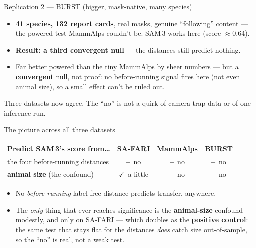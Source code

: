 \documentclass[aspectratio=169,11pt]{beamer}
\newcommand{\ck}{{\color{forest}$\checkmark$}}
\newcommand{\no}{{\color{burnt}\textbf{--}}}
\begin{document}
\begin{frame}{Replication 2 --- BURST (bigger, mask-native, many species)}
  \begin{itemize}\footnotesize
    \item \textbf{41 species, 132 report cards}, real masks, genuine ``following'' content --- the powered test
          MammAlps couldn't be. SAM\,3 works here (score $\approx 0.64$).
    \item \textbf{Result: a third convergent null} --- the distances still predict nothing.
    \item Far better powered than the tiny MammAlps by sheer numbers --- but a \textbf{convergent} null, not
          proof: no before-running signal fires here (not even animal size), so a small effect can't be ruled out.
  \end{itemize}
  \vspace{0.3em}
  \begin{block}{}\centering\footnotesize
    Three datasets now agree. The ``no'' is not a quirk of camera-trap data or of one inference run.
  \end{block}
\end{frame}

\begin{frame}{The picture across all three datasets}
  \centering
  \footnotesize
  \begin{tabular}{lccc}
    \toprule
    Predict SAM\,3's score from\dots & SA-FARI & MammAlps & BURST \\
    \midrule
    the four before-running distances & \no\ no & \no\ no & \no\ no \\
    \textbf{animal size} (the confound) & \ck\ a little & \no\ no & \no\ no \\
    \bottomrule
  \end{tabular}
  \vspace{0.6em}
  \begin{itemize}\footnotesize
    \item No \emph{before-running} label-free distance predicts transfer, anywhere.
    \item The \emph{only} thing that ever reaches significance is the \textbf{animal-size} confound --- modestly,
          and only on SA-FARI --- which doubles as the \textbf{positive control}: the same test that stays flat
          for the distances \emph{does} catch size out-of-sample, so the ``no'' is real, not a weak test.
  \end{itemize}
\end{frame}
\end{document}
